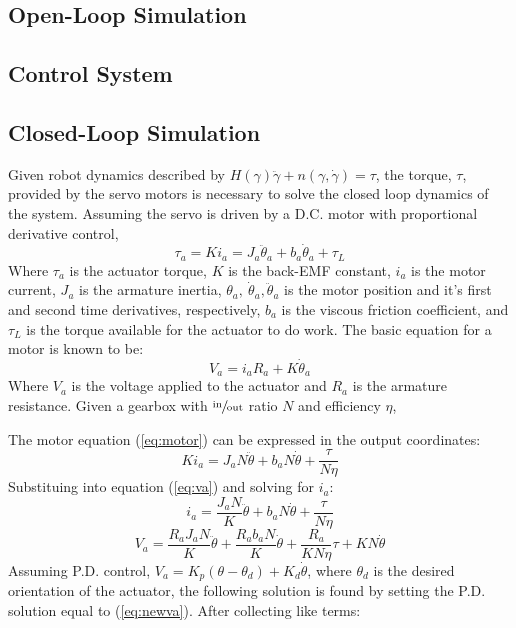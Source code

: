 \documentclass[12pt]{report}
\begin{document}
\subsection{Open-Loop Simulation}
\subsection{Control System}
\newpage
\subsection{Closed-Loop Simulation}
Given robot dynamics described by \(H(\gamma)\ddot{\gamma} + n(\gamma,\dot{\gamma}) = \tau\), the torque, $\tau$, provided by the servo motors is necessary to solve the closed loop dynamics of the system. Assuming the servo is driven by a D.C. motor with proportional derivative control,
\begin{equation}
  \tau_a = Ki_a = J_a\ddot{\theta}_a + b_a\dot{\theta}_a + \tau_L
  \label{eq:motor}
\end{equation}
Where $\tau_a$ is the actuator torque, $K$ is the back-EMF constant, $i_a$ is the motor current, $J_a$ is the armature inertia, $\theta_a,~\dot{\theta}_a,\ddot{\theta}_a$ is the motor position and it's first and second time derivatives, respectively, $b_a$ is the viscous friction coefficient, and $\tau_L$ is the torque available for the actuator to do work. The basic equation for a motor is known to be:
\begin{equation}
  V_a = i_aR_a + K\dot{\theta}_a
  \label{eq:va}
\end{equation}
Where $V_a$ is the voltage applied to the actuator and $R_a$ is the armature resistance. Given a gearbox with $\sfrac{\text{in}}{\text{out}}$ ratio $N$ and efficiency $\eta$,

The motor equation (\ref{eq:motor}) can be expressed in the output coordinates:
\[
Ki_a = J_aN\ddot{\theta} + b_aN\dot{\theta} + \frac{\tau}{N\eta}
\]
Substituing into equation (\ref{eq:va}) and solving for $i_a$:
\[
  i_a = \frac{J_aN}{K}\ddot{\theta} + b_aN\dot{\theta} + \frac{\tau}{N\eta}
\]
\begin{equation}
  V_a = \frac{R_aJ_aN}{K}\ddot{\theta} + \frac{R_ab_aN}{K}\dot{\theta} + \frac{R_a}{KN\eta}\tau + KN\dot{\theta}
  \label{eq:newva}
\end{equation}
Assuming P.D. control, \(V_a = K_p(\theta-\theta_d) + K_d\dot{\theta}\), where $\theta_d$ is the desired orientation of the actuator, the following solution is found by setting the P.D. solution equal to (\ref{eq:newva}). After collecting like terms:
\end{document}
